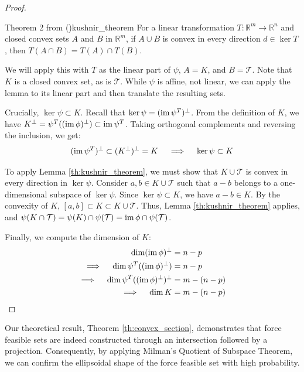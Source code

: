\begin{proof}
    \begin{lemmabox}{Theorem 2 from (\cite{kushnirLinearTransformationsIntersections})}{kushnir_theorem}
    For a linear transformation $T: \mathbb{R}^m \rightarrow \mathbb{R}^n$ and closed convex sets $A$ and $B$ in $\mathbb{R}^m$, if $A \cup B$ is convex in every direction $d \in \ker T$, then $T(A \cap B) = T(A) \cap T(B)$.
    \end{lemmabox}
    
    We will apply this with $T$ as the linear part of $\psi$, $A = K$, and $B = \mathcal{T}$.  Note that $K$ is a closed convex set, as is $\mathcal{T}$. While $\psi$ is affine, not linear, we can apply the lemma to its linear part and then translate the resulting sets.
    
    Crucially, $\ker \psi \subset K$.  Recall that $\ker \psi = (\operatorname{im} \psi^T)^\perp$.  From the definition of $K$, we have $K^\perp = \psi^T((\operatorname{im} \phi)^\perp) \subset \operatorname{im} \psi^T$. Taking orthogonal complements and reversing the inclusion, we get:
    \begin{align*}
        (\operatorname{im} \psi^T)^\perp \subset (K^\perp)^\perp = K  \quad \implies \quad \ker{\psi} \subset K
    \end{align*}
    
    To apply Lemma \ref{th:kushnir_theorem}, we must show that $K \cup \mathcal{T}$ is convex in every direction in $\ker \psi$. Consider $a, b \in K \cup \mathcal{T}$ such that $a - b$ belongs to a one-dimensional subspace of $\ker \psi$. Since $\ker \psi \subset K$, we have $a - b \in K$. By the convexity of $K$, $[a, b] \subset K \subset K \cup \mathcal{T}$.  Thus, Lemma \ref{th:kushnir_theorem} applies, and $\psi(K \cap \mathcal{T}) = \psi(K) \cap \psi(\mathcal{T}) = \operatorname{im} \phi \cap \psi(\mathcal{T})$.
    
    Finally, we compute the dimension of $K$:
      \begin{align*}
        \dim (\operatorname{im} \phi)^\perp &= n - p \\
        \implies \quad \dim \psi^T((\operatorname{im} \phi)^\perp) &= n - p \\
        \implies \quad \dim \psi^T((\operatorname{im} \phi)^\perp)^\perp &= m - (n-p) \\
        \implies \quad \dim K &= m - (n-p)
      \end{align*}
\end{proof}

Our theoretical result, Theorem \ref{th:convex_section}, demonstrates that force feasible sets are indeed constructed through an intersection followed by a projection. Consequently, by applying Milman's Quotient of Subspace Theorem, we can confirm the ellipsoidal shape of the force feasible set with high probability.

